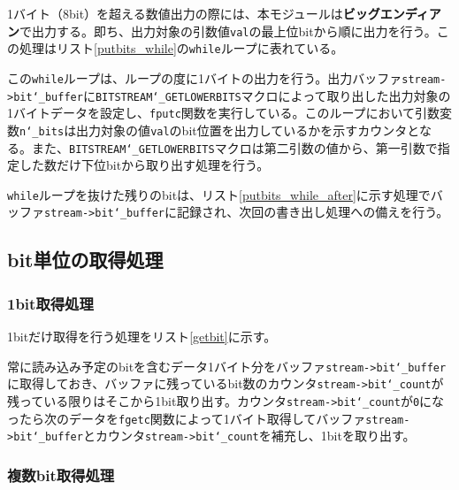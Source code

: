 \documentclass[uplatex,dvipdfmx,b5j,10pt]{jsbook}
\theoremstyle{definition}
\begin{document}
1バイト（8bit）を超える数値出力の際には、本モジュールは\textbf{ビッグエンディアン}で出力する。即ち、出力対象の引数値\texttt{val}の最上位bitから順に出力を行う。この処理はリスト\ref{putbits_while}の\texttt{while}ループに表れている。


この\texttt{while}ループは、ループの度に1バイトの出力を行う。出力バッファ\texttt{stream->bit\char`_buffer}に\texttt{BITSTREAM\char`_GETLOWERBITS}マクロによって取り出した出力対象の1バイトデータを設定し、\texttt{fputc}関数を実行している。このループにおいて引数変数\texttt{n\char`_bits}は出力対象の値\texttt{val}のbit位置を出力しているかを示すカウンタとなる。また、\texttt{BITSTREAM\char`_GETLOWERBITS}マクロは第二引数の値から、第一引数で指定した数だけ下位bitから取り出す処理を行う。

\texttt{while}ループを抜けた残りのbitは、リスト\ref{putbits_while_after}に示す処理でバッファ\texttt{stream->bit\char`_buffer}に記録され、次回の書き出し処理への備えを行う。


\subsection{bit単位の取得処理}

\subsubsection{1bit取得処理}

1bitだけ取得を行う処理をリスト\ref{getbit}に示す。


常に読み込み予定のbitを含むデータ1バイト分をバッファ\texttt{stream->bit\char`_buffer}に取得しておき、バッファに残っているbit数のカウンタ\texttt{stream->bit\char`_count}が残っている限りはそこから1bit取り出す。カウンタ\texttt{stream->bit\char`_count}が\texttt{0}になったら次のデータを\texttt{fgetc}関数によって1バイト取得してバッファ\texttt{stream->bit\char`_buffer}とカウンタ\texttt{stream->bit\char`_count}を補充し、1bitを取り出す。

\subsubsection{複数bit取得処理}
\end{document}
